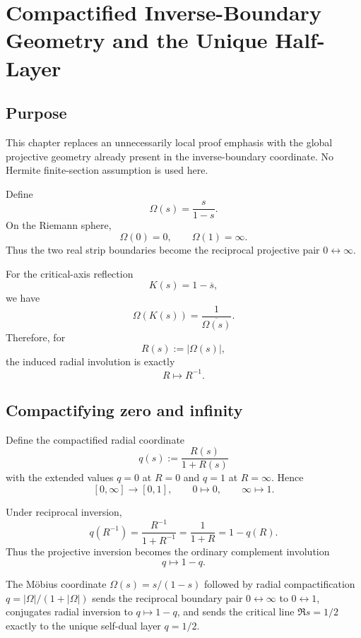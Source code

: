 \chapter{Compactified Inverse-Boundary Geometry and the Unique Half-Layer}
\label{ch:compactified-inverse-boundary}


\section{Purpose}

This chapter replaces an unnecessarily local proof emphasis with the global projective geometry already present in the inverse-boundary coordinate. No Hermite finite-section assumption is used here.

Define
\[
\Omega(s)=\frac{s}{1-s}.
\]
On the Riemann sphere,
\[
\Omega(0)=0,
\qquad
\Omega(1)=\infty.
\]
Thus the two real strip boundaries become the reciprocal projective pair $0\leftrightarrow\infty$.

For the critical-axis reflection
\[
K(s)=1-\overline{s},
\]
we have
\[
\Omega(K(s))=\frac{1}{\overline{\Omega(s)}}.
\]
Therefore, for
\[
R(s):=|\Omega(s)|,
\]
the induced radial involution is exactly
\[
R\longmapsto R^{-1}.
\]

\section{Compactifying zero and infinity}

Define the compactified radial coordinate
\[
\boxed{
q(s):=\frac{R(s)}{1+R(s)}
}
\]
with the extended values $q=0$ at $R=0$ and $q=1$ at $R=\infty$. Hence
\[
[0,\infty]\longrightarrow[0,1],
\qquad
0\mapsto0,
\qquad
\infty\mapsto1.
\]

Under reciprocal inversion,
\[
q\left(R^{-1}\right)
=\frac{R^{-1}}{1+R^{-1}}
=\frac{1}{1+R}
=1-q(R).
\]
Thus the projective inversion becomes the ordinary complement involution
\[
\boxed{q\mapsto1-q}.
\]

\begin{theorem}
The Möbius coordinate $\Omega(s)=s/(1-s)$ followed by radial compactification $q=|\Omega|/(1+|\Omega|)$ sends the reciprocal boundary pair $0\leftrightarrow\infty$ to $0\leftrightarrow1$, conjugates radial inversion to $q\mapsto1-q$, and sends the critical line $\Re s=1/2$ exactly to the unique self-dual layer $q=1/2$.
\end{theorem}

